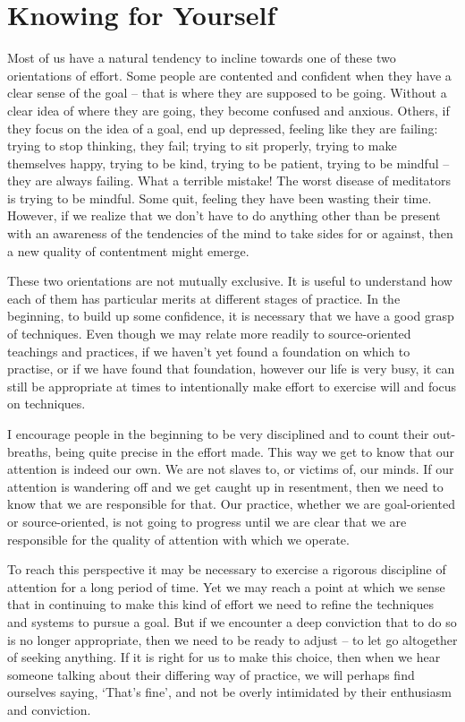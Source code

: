 \section{Knowing for Yourself}

Most of us have a natural tendency to incline towards one of these two
orientations of effort. Some people are contented and confident when
they have a clear sense of the goal -- that is where they are supposed
to be going. Without a clear idea of where they are going, they become
confused and anxious. Others, if they focus on the idea of a goal, end
up depressed, feeling like they are failing: trying to stop thinking,
they fail; trying to sit properly, trying to make themselves happy,
trying to be kind, trying to be patient, trying to be mindful -- they
are always failing. What a terrible mistake! The worst disease of
meditators is trying to be mindful. Some quit, feeling they have been
wasting their time. However, if we realize that we don't have to do
anything other than be present with an awareness of the tendencies of
the mind to take sides for or against, then a new quality of contentment might emerge.

These two orientations are not mutually exclusive. It is useful to
understand how each of them has particular merits at different stages of
practice. In the beginning, to build up some confidence, it is necessary
that we have a good grasp of techniques. Even though we may relate more
readily to source-oriented teachings and practices, if we haven't yet
found a foundation on which to practise, or if we have found that
foundation, however our life is very busy, it can still be appropriate
at times to intentionally make effort to exercise will and focus on techniques.

I encourage people in the beginning to be very disciplined and to count
their out-breaths, being quite precise in
the effort made. This way we get to know that our attention is indeed
our own. We are not slaves to, or victims of, our minds. If our
attention is wandering off and we get caught up in resentment,
then we need to know that we are responsible for that. Our practice,
whether we are goal-oriented or source-oriented, is not going to
progress until we are clear that we are responsible for the quality of
attention with which we operate.

To reach this perspective it may be necessary to exercise a rigorous
discipline of attention for a long period of time. Yet we may reach a
point at which we sense that in continuing to make this kind of effort
we need to refine the techniques and systems to pursue a goal. But if we
encounter a deep conviction that to do so is no longer appropriate, then
we need to be ready to adjust -- to let go altogether of seeking
anything. If it is right for us to make this choice, then when we hear someone talking about their differing way of practice, we will perhaps find ourselves saying, `That's fine', and not be overly intimidated by their enthusiasm and conviction. 

